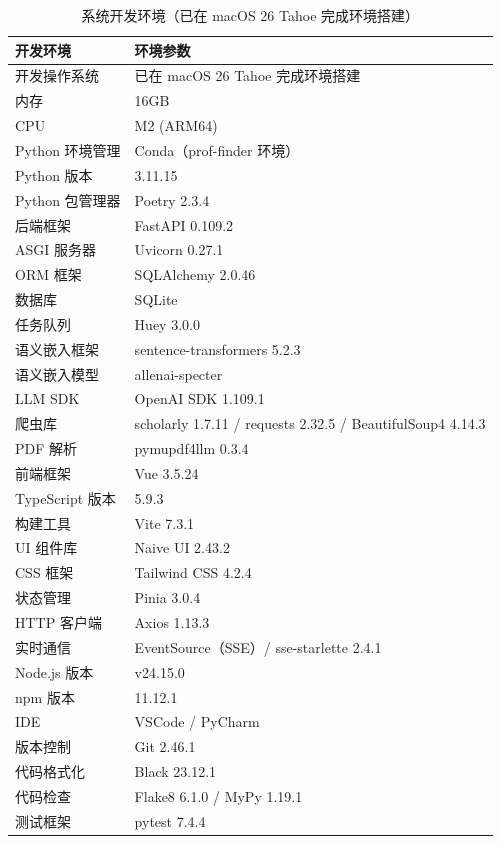 \documentclass[11pt]{article}
\begin{document}
\begin{table}[htbp]
  \centering
  \caption{系统开发环境（已在 macOS 26 Tahoe 完成环境搭建）}
  \begin{tabular}{ll}
    \toprule
    开发环境 & 环境参数 \\
    \midrule
    开发操作系统 & 已在 macOS 26 Tahoe 完成环境搭建 \\
    内存 & 16GB \\
    CPU & M2 (ARM64) \\
    Python 环境管理 & Conda（prof-finder 环境） \\
    Python 版本 & 3.11.15 \\
    Python 包管理器 & Poetry 2.3.4 \\
    后端框架 & FastAPI 0.109.2 \\
    ASGI 服务器 & Uvicorn 0.27.1 \\
    ORM 框架 & SQLAlchemy 2.0.46 \\
    数据库 & SQLite \\
    任务队列 & Huey 3.0.0 \\
    语义嵌入框架 & sentence-transformers 5.2.3 \\
    语义嵌入模型 & allenai-specter \\
    LLM SDK & OpenAI SDK 1.109.1 \\
    爬虫库 & scholarly 1.7.11 / requests 2.32.5 / BeautifulSoup4 4.14.3 \\
    PDF 解析 & pymupdf4llm 0.3.4 \\
    前端框架 & Vue 3.5.24 \\
    TypeScript 版本 & 5.9.3 \\
    构建工具 & Vite 7.3.1 \\
    UI 组件库 & Naive UI 2.43.2 \\
    CSS 框架 & Tailwind CSS 4.2.4 \\
    状态管理 & Pinia 3.0.4 \\
    HTTP 客户端 & Axios 1.13.3 \\
    实时通信 & EventSource（SSE）/ sse-starlette 2.4.1 \\
    Node.js 版本 & v24.15.0 \\
    npm 版本 & 11.12.1 \\
    IDE & VSCode / PyCharm \\
    版本控制 & Git 2.46.1 \\
    代码格式化 & Black 23.12.1 \\
    代码检查 & Flake8 6.1.0 / MyPy 1.19.1 \\
    测试框架 & pytest 7.4.4 \\
    \bottomrule
  \end{tabular}
  \label{tab:dev_env_macos}
\end{table}
\end{document}
